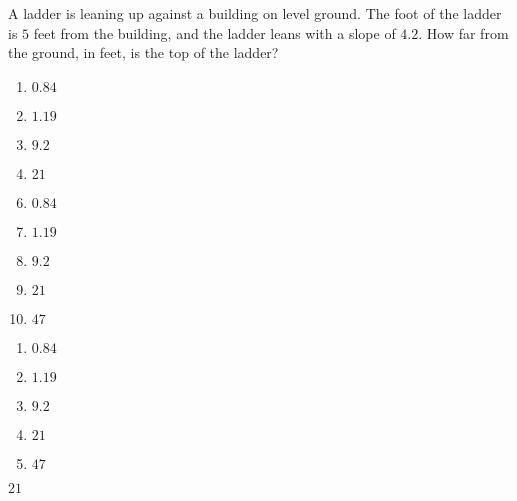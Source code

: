 

A ladder is leaning up against a building on level ground.
The foot of the ladder is $5$ feet from the building, and
the ladder leans with a slope of $4.2$.  How far from the
ground, in feet, is the top of the ladder?



\ifsat
	\begin{enumerate}[label=\Alph*)]
		\item $0.84$
		\item $1.19$
		\item $9.2$
		\item $21$%
	\end{enumerate}
\else
\fi

\ifacteven
	\begin{enumerate}[label=\textbf{\Alph*.},itemsep=\fill,align=left]
		\setcounter{enumii}{5}
		\item $0.84$
		\item $1.19$
		\item $9.2$
		\addtocounter{enumii}{1}
		\item $21$%
		\item $47$
	\end{enumerate}
\else
\fi

\ifactodd
	\begin{enumerate}[label=\textbf{\Alph*.},itemsep=\fill,align=left]
		\item $0.84$
		\item $1.19$
		\item $9.2$
		\item $21$%
		\item $47$
	\end{enumerate}
\else
\fi

\ifgridin
 $21$%

\else
\fi

